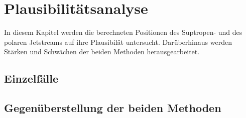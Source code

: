 \chapter{Plausibilitätsanalyse} \label{ch:plausibilitaet}
In diesem Kapitel werden die berechneten Positionen des Suptropen- und des polaren Jetstreams auf ihre Plausibilät untersucht. Darüberhinaus werden Stärken und Schwächen der beiden Methoden herausgearbeitet.

\section{Einzelfälle}



%
\section{Gegenüberstellung der beiden Methoden}



